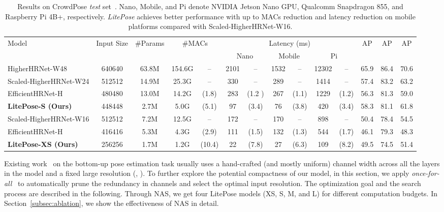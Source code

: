 \documentclass[10pt,twocolumn,letterpaper]{article}
\begin{document}
\begin{table*}[t]
\setlength{\tabcolsep}{3pt}
  \centering
  \small
  \begin{tabular}{lccccccccccccc}
    \toprule
    \multirow{2}{*}[\multirowcenter]{Model} & \multirow{2}{*}[\multirowcenter]{Input Size} & \multirow{2}{*}[\multirowcenter]{\#Params} & \multicolumn{2}{c}{\multirow{2}{*}[\multirowcenter]{\#MACs}} & \multicolumn{6}{c}{Latency (ms)} & \multirow{2}{*}[\multirowcenter]{AP} & \multirow{2}{*}[\multirowcenter]{AP} & \multirow{2}{*}[\multirowcenter]{AP}\\
    \cmidrule{6-11} 
    & & & & & \multicolumn{2}{c}{Nano} & \multicolumn{2}{c}{Mobile} & \multicolumn{2}{c}{Pi}\\
    \midrule
    HigherHRNet-W48~\cite{cheng2020higherhrnet} & 640640 & 63.8M & 154.6G & -- & 2101 & -- & 1532 & -- &12302& -- & 65.9 & 86.4 & 70.6\\
    \midrule
    Scaled-HigherHRNet-W24 & 512512 & 14.9M & 25.3G & -- & 330 & -- & 289 & -- & 1414 & -- & 57.4 & 83.2 & 63.2\\
    EfficientHRNet-H~\cite{neff2020efficienthrnet} & 480480 & 13.0M & 14.2G & (1.8) & 283 & (1.2 ) & 267 & (1.1) & 1229 & (1.2) &56.3 & 81.3 &59.0\\
    \textbf{LitePose-S (Ours)} & 448448 & 2.7M & 5.0G & (5.1) & 97 & (3.4)& 76 & (3.8)&420 & (3.4)& 58.3 & 81.1 & 61.8\\
    \midrule
   Scaled-HigherHRNet-W16 & 512512 & 7.2M & 12.5G & -- & 172 & -- & 170 & -- & 898 & -- & 50.4 & 78.4 & 54.5\\
    EfficientHRNet-H~\cite{neff2020efficienthrnet} & 416416 & 5.3M & 4.3G & (2.9) & 111 & (1.5) & 132 & (1.3) & 544 & (1.7) & 46.1 & 79.3 & 48.3\\
    \textbf{LitePose-XS (Ours)} & 256256 & 1.7M & 1.2G & (10.4) & 22 & (7.8) & 27 & (6.3) & 109 & (8.2) & 49.5 & 74.5 & 51.4\\
    \bottomrule
  \end{tabular}
    \caption{Results on CrowdPose \textit{test} set~\cite{li2019crowdpose}. Nano, Mobile, and Pi denote NVIDIA Jetson Nano GPU, Qualcomm Snapdragon 855, and Raspberry Pi 4B+, respectively.  \textit{LitePose} achieves better performance with up to  MACs reduction and  latency reduction on mobile platforms compared with Scaled-HigherHRNet-W16.}
  \label{tab:CrowdPose}
\end{table*} 
Existing work~\cite{cheng2020higherhrnet,geng2021bottom,kreiss2019pifpaf,papandreou2018personlab,cao2019openpose,newell2016stacked,osokin2018real} on the bottom-up pose estimation task usually uses a hand-crafted (and mostly uniform) channel width across all the layers in the model and a fixed large resolution (\eg, ). To further explore the potential compactness of our model, in this section, we apply \textit{once-for-all}~\cite{cai2019once} to automatically prune the redundancy in channels and select the optimal input resolution. The optimization goal and the search process are described in the following. Through NAS, we get four LitePose models (XS, S, M, and L) for different computation budgets. In Section~\ref{subsec:ablation}, we show the effectiveness of NAS in detail.
\end{document}

